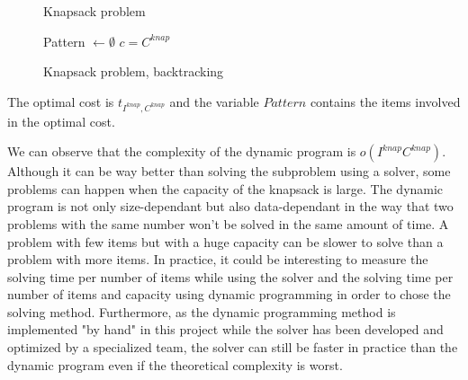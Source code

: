 \begin{figure}[!ht]
	\centering
	\begin{minipage}[t]{0.48\linewidth}
		\begin{algorithm}[H]
			\DontPrintSemicolon 
			\caption{Knapsack problem}
		\end{algorithm}
	\end{minipage}
	\hfill
	\begin{minipage}[t]{0.49\linewidth}
		\begin{algorithm}[H]
			\DontPrintSemicolon 
			Pattern $ \leftarrow \emptyset$\;
			$c = C^{knap}$\;
			\caption{Knapsack problem, backtracking}
		\end{algorithm}
	\end{minipage}
\end{figure}
\newpage

\noindent The optimal cost is $t_{I^{knap}, C^{knap}}$ and the variable $Pattern$ contains the items involved in the optimal cost.

We can observe that the complexity of the dynamic program is $o(I^{knap}C^{knap})$. Although it can be way better than solving the subproblem using a solver, some problems can happen when the capacity of the knapsack is large. The dynamic program is not only size-dependant but also data-dependant in the way that two problems with the same number won't be solved in the same amount of time. A problem with few items but with a huge capacity can be slower to solve than a problem with more items. In practice, it could be interesting to measure the solving time per number of items while using the solver and the solving time per number of items and capacity using dynamic programming in order to chose the solving method. Furthermore, as the dynamic programming method is implemented "by hand" in this project while the solver has been developed and optimized by a specialized team, the solver can still be faster in practice than the dynamic program even if the theoretical complexity is worst.